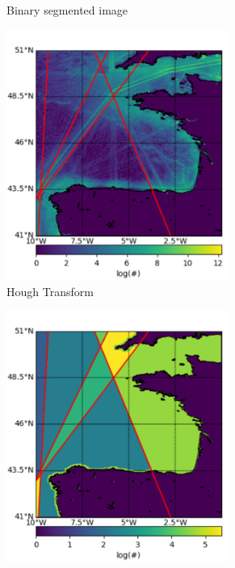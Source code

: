 \documentclass{article}
\begin{document}
\begin{figure}[h]
\begin{subfigure}[b]{0.5\linewidth}
    \caption{Binary segmented image} 
    \label{fig7:b} 
    \vspace{4ex}
  \end{subfigure} 
  \begin{subfigure}[b]{0.5\linewidth}
    \centering
    \includegraphics[width=0.8\textwidth]{CELTIClines-crop.pdf} 
    \caption{Hough Transform} 
    \label{fig7:c} 
  \end{subfigure}%
  \begin{subfigure}[b]{0.5\linewidth}
    \centering
    \includegraphics[width=0.8\textwidth]{CELTICsegmented-crop.pdf} 

\end{subfigure}
\end{figure}
\end{document}
